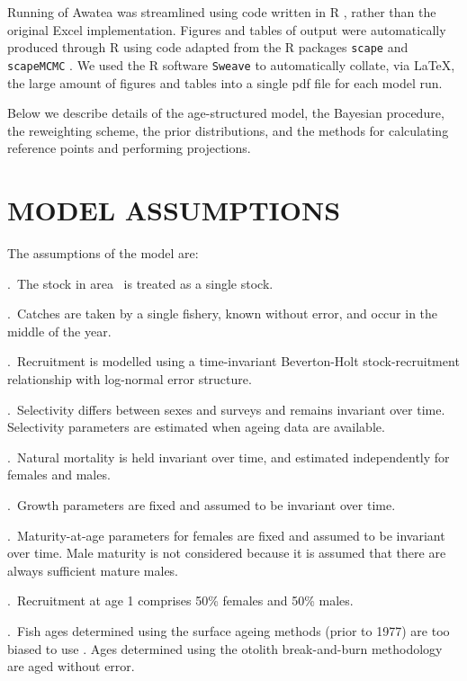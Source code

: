 
Running of Awatea was streamlined using code written in R \citep{R12}, rather than the original Excel implementation. Figures and tables of output were automatically produced through R using code adapted from the R packages {\tt scape} \citep{magn09} and {\tt scapeMCMC} \citep{ms07}. We used the R software {\tt Sweave} \citep{leis02} to automatically collate, via LaTeX, the large amount of figures and tables into a single pdf file for each model run.

Below we describe details of the age-structured model, the Bayesian procedure, the reweighting scheme, the prior distributions, and the methods for calculating reference points and performing projections.



\section{MODEL ASSUMPTIONS}

The assumptions of the model are:

.~The stock in area \area~is treated as a single stock.

.~Catches are taken by a single fishery, known without error, and occur in the middle of the year.

.~Recruitment is modelled using a time-invariant Beverton-Holt stock-recruitment relationship with log-normal error structure.

.~Selectivity differs between sexes and surveys and remains invariant over time. Selectivity parameters are estimated when ageing data are available.

.~Natural mortality is held invariant over time, and estimated independently for females and males.

.~Growth parameters are fixed and assumed to be invariant over time.

.~Maturity-at-age parameters for females are fixed and assumed to be invariant over time. Male maturity is not considered because it is assumed that there are always sufficient mature males.

.~Recruitment at age 1 comprises 50\% females and 50\% males.

.~Fish ages determined using the surface ageing methods (prior to 1977) are too biased to use \citep{beam79}. Ages determined using the otolith break-and-burn methodology \citep{macl97} are aged without error. 

